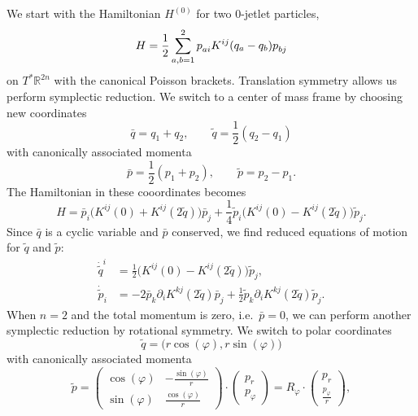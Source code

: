 \documentclass[12pt]{amsart}
\newcommand{\R}{\ensuremath{\mathbb{R}}}
\begin{document}
We start with the Hamiltonian $H^{(0)}$ for two $0$-jetlet particles,
\begin{equation}\label{eq:H-two-0jetlets}
  H = \frac{1}{2} \sum_{a,b=1}^2 p\indices{_a_i} K^{ij}(q_a - q_b) p\indices{_b_j}
\end{equation}
on $T^* \R^{2n}$ with the canonical Poisson brackets.
Translation symmetry allows us perform symplectic reduction. We switch
to a center of mass frame by choosing new coordinates
\begin{equation}\label{eq:CoM-coords}
  \bar{q} = q_1 + q_2, \qquad \tilde{q} = \frac{1}{2}(q_2 - q_1)
\end{equation}
with canonically associated momenta
\begin{equation*}
  \bar{p} = \frac{1}{2}(p_1 + p_2), \qquad \tilde{p} = p_2 - p_1.
\end{equation*}
The Hamiltonian in these cooordinates becomes
\begin{equation*}
  H =               \bar{p}_i \big( K^{ij}(0) + K^{ij}(2\tilde{q}) \big)   \bar{p}_j
     +\frac{1}{4} \tilde{p}_i \big( K^{ij}(0) - K^{ij}(2\tilde{q}) \big) \tilde{p}_j.
\end{equation*}
Since $\bar{q}$ is a cyclic variable and $\bar{p}$ conserved, we
find reduced equations of motion for $\tilde{q}$ and $\tilde{p}$:
\begin{equation}\label{eq:EoM-lin-reduced}
  \begin{aligned}
    \dot{\tilde{q}}^i &= \frac{1}{2}\big( K^{ij}(0) - K^{ij}(2\tilde{q}) \big) \tilde{p}_j, \\
    \dot{\tilde{p}}_i &= -2 \bar{p}_k \partial_i K^{kj}(2\tilde{q}) \bar{p}_j
                         +\frac{1}{2} \tilde{p}_k \partial_i K^{kj}(2\tilde{q}) \tilde{p}_j.
  \end{aligned}
\end{equation}
When $n = 2$ and the total momentum is zero, i.e.~$\bar{p} = 0$, we can perform
another symplectic reduction by rotational symmetry. We switch to
polar coordinates
\begin{equation}\label{eq:polar-coords}
  \tilde{q} = \big(r\cos(\varphi),r\sin(\varphi)\big)
\end{equation}
with canonically associated momenta
\begin{equation*}
  \tilde{p} =
  \begin{pmatrix}
    \cos(\varphi) & -\frac{\sin(\varphi)}{r} \\
    \sin(\varphi) &  \frac{\cos(\varphi)}{r}
  \end{pmatrix} \cdot
  \begin{pmatrix}
    p_r \\
    p_\varphi
  \end{pmatrix}
  = R_\varphi \cdot
  \begin{pmatrix}
    p_r \\
    \frac{p_\varphi}{r}
  \end{pmatrix},
\end{equation*}
\end{document}
